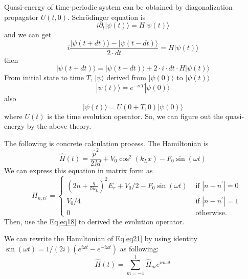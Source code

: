 \documentclass{article}
\begin{document}
    Quasi-energy of time-periodic system can be obtained by diagonalization propagator $U(t, 0)$.
    Schrödinger equation is 
    \begin{equation}
        i \partial_t|\psi(t)\rangle = H|\psi(t)\rangle
    \end{equation}
    and we can get
    \begin{equation}
       i \frac{|\psi(t + dt)\rangle - |\psi(t - dt)\rangle}{2 \cdot dt} = H|\psi(t)\rangle 
    \end{equation} 
    then 
    \begin{equation}
        |\psi(t + dt)\rangle = |\psi(t - dt)\rangle + 2 \cdot i \cdot dt \cdot H |\psi(t)\rangle   \label{eq18}
    \end{equation}
    From initial state to time $T$, $|\psi \rangle$ derived from $|\psi(0)\rangle $ to $|\psi(t)\rangle$
    \begin{equation}
        |\psi(t)\rangle = e^{-i \epsilon T} |\psi(0)\rangle
    \end{equation}
    also
    \begin{equation}
        |\psi(t)\rangle = U(0+T, 0) |\psi(0)\rangle
    \end{equation}
    where $U(t)$ is the time evolution operator. So, we can figure out the quasi-energy by the above theory.

    The following is concrete calculation process. The Hamiltonian is 
    \begin{equation}
        \hat{H}(t)=\frac{\hat{p}^{2}}{2 M}+V_{0} \cos ^{2}\left(k_{L} x\right)-F_{0} \sin (\omega t) \label{eq21}
    \end{equation}
    We can express this equation in matrix form as
    \begin{equation}
        \quad H_{n, n^{\prime}}=\left\{\begin{array}{ll}{\left(2 n+\frac{q}{\hbar k_{L}}\right)^{2} E_{r}+V_{0} / 2 - F_{0} \sin (\omega t)} & {\text { if }\left|n-n^{\prime}\right|=0} 
        \\ {V_{0} / 4} & {\text { if }\left|n-n^{\prime}\right|=1} 
        \\ {0} & {\text { otherwise. }}\end{array}\right.
    \end{equation}
    Then, use the Eq\eqref{eq18} to derived the evolution operator.
   
    
    We can rewrite the Hamiltonian of Eq\eqref{eq21} by using identity $\sin (\omega t)=1 /(2 i)\left(e^{i \omega t}-e^{-i \omega t}\right)$ as following:
    \begin{equation}
        \hat{H}(t)=\sum_{m=-1}^{1} \hat{H}_{m} e^{i m \omega t}
    \end{equation}
    
\end{document}
